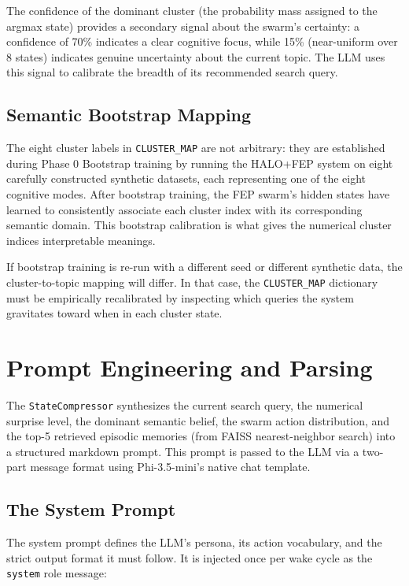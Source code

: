 The confidence of the dominant cluster (the probability mass assigned to the argmax state) provides a secondary signal about the swarm's certainty: a confidence of 70\% indicates a clear cognitive focus, while 15\% (near-uniform over 8 states) indicates genuine uncertainty about the current topic. The LLM uses this signal to calibrate the breadth of its recommended search query.

\subsection{Semantic Bootstrap Mapping}

The eight cluster labels in \texttt{CLUSTER\_MAP} are not arbitrary: they are established during Phase 0 Bootstrap training by running the HALO+FEP system on eight carefully constructed synthetic datasets, each representing one of the eight cognitive modes. After bootstrap training, the FEP swarm's hidden states have learned to consistently associate each cluster index with its corresponding semantic domain. This bootstrap calibration is what gives the numerical cluster indices interpretable meanings.

If bootstrap training is re-run with a different seed or different synthetic data, the cluster-to-topic mapping will differ. In that case, the \texttt{CLUSTER\_MAP} dictionary must be empirically recalibrated by inspecting which queries the system gravitates toward when in each cluster state.

\section{Prompt Engineering and Parsing}

The \texttt{StateCompressor} synthesizes the current search query, the numerical surprise level, the dominant semantic belief, the swarm action distribution, and the top-5 retrieved episodic memories (from FAISS nearest-neighbor search) into a structured markdown prompt. This prompt is passed to the LLM via a two-part message format using Phi-3.5-mini's native chat template.

\subsection{The System Prompt}

The system prompt defines the LLM's persona, its action vocabulary, and the strict output format it must follow. It is injected once per wake cycle as the \texttt{system} role message:

